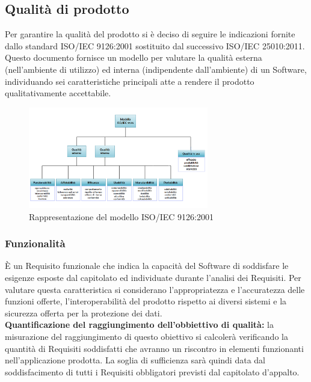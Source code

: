 \subsection{Qualità di prodotto}
Per garantire la qualità del prodotto si è deciso di seguire le indicazioni fornite dallo standard ISO/IEC 9126:2001 sostituito dal successivo ISO/IEC 25010:2011. Questo documento fornisce un modello per valutare la qualità esterna (nell’ambiente di utilizzo) ed interna (indipendente dall’ambiente) di un Software, individuando sei caratteristiche principali atte a rendere il prodotto qualitativamente accettabile.

\begin{figure}[h]
  \centering
    \includegraphics[width=0.7\textwidth]{./images/ISO-IEC_9126}
  \caption{Rappresentazione del modello ISO/IEC 9126:2001}
  \label{fig:ISO-IEC_9126}
\end{figure}


\subsubsection{Funzionalità}
È un Requisito funzionale che indica la capacità del Software di soddisfare le esigenze esposte dal capitolato ed individuate durante l’analisi dei Requisiti. Per valutare questa caratteristica si considerano l'appropriatezza e l'accuratezza delle funzioni offerte, l'interoperabilità del prodotto rispetto ai diversi sistemi e la sicurezza offerta per la protezione dei dati.\\ 
\textbf{Quantificazione del raggiungimento dell’obbiettivo di qualità:} la misurazione
del raggiungimento di questo obiettivo si calcolerà verificando la quantità
di Requisiti soddisfatti che avranno un riscontro in elementi funzionanti
nell’applicazione prodotta. La soglia di sufficienza sarà quindi data dal soddisfacimento
di tutti i Requisiti obbligatori previsti dal capitolato d’appalto.


